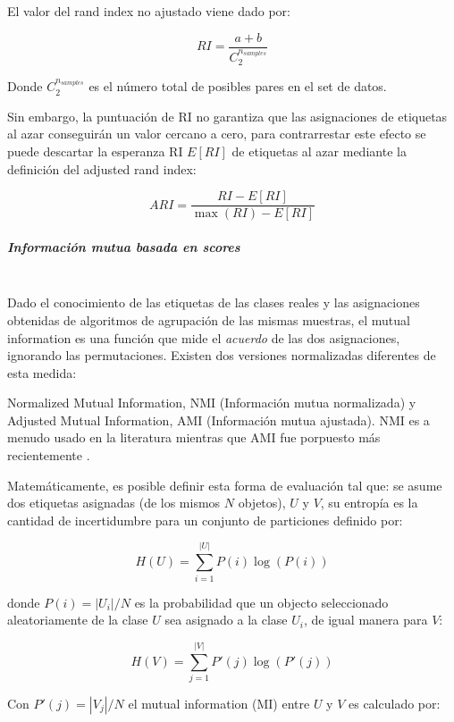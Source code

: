 El valor del rand index no ajustado viene dado por:

\begin{equation}
	RI = \frac{a + b}{C_2^{n_{samples}}}
\end{equation}

Donde $C_2^{n_{samples}}$ es el número total de posibles pares en el set de datos.

Sin embargo, la puntuación de RI no garantiza que las asignaciones de etiquetas al azar conseguirán un valor cercano a cero, para contrarrestar este efecto se puede descartar la esperanza RI $E[RI]$ de etiquetas al azar mediante la definición del adjusted rand index:

\begin{equation}
	ARI = \frac{RI - E[RI]}{\max(RI) - E[RI]}	
\end{equation}

\subparagraph{Información mutua basada en scores\\\\}

Dado el conocimiento de las etiquetas de las clases reales y las asignaciones obtenidas de algoritmos de agrupación de las mismas muestras, el mutual information es una función que mide el \textit{acuerdo} de las dos asignaciones, ignorando las permutaciones. Existen dos versiones normalizadas diferentes de esta medida:

Normalized Mutual Information, NMI (Información mutua normalizada) y Adjusted Mutual Information, AMI (Información mutua ajustada). NMI es a menudo usado en la literatura mientras que AMI fue porpuesto más recientemente \cite{peng2005feature}.

Matemáticamente, es posible definir esta forma de evaluación tal que: se asume dos etiquetas asignadas (de los mismos $N$ objetos), $U$ y $V$, su entropía es la cantidad de incertidumbre para un conjunto de particiones definido por:

\begin{equation}
	H(U) = \sum_{i=1}^{|U|}P(i)\log(P(i))
\end{equation}

donde $P(i) = |U_i| / N$ es la probabilidad que un objecto seleccionado aleatoriamente de la clase $U$ sea asignado a la clase $U_i$, de igual manera para $V$:

\begin{equation}	
	H(V) = \sum_{j=1}^{|V|}P'(j)\log(P'(j))
\end{equation}

Con $P'(j) = |V_j| / N$ el mutual information (MI) entre $U$ y $V$ es calculado por:

